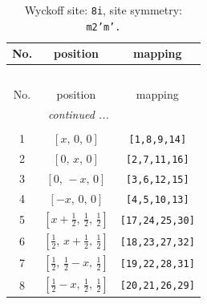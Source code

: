 \documentclass[fleqn,8pt]{jsarticle}
\begin{document}
\begin{longtable}{ccc}
\caption{Wyckoff site: {\tt 8i}, site symmetry: {\tt m2'm'.}}
 \\
 \hline \hline
No. & position & mapping \\ \hline \endfirsthead

\multicolumn{2}{l}{\tablename\ \thetable{}} \\
 \hline \hline
No. & position & mapping \\ \hline \endhead

 \hline \hline
\multicolumn{2}{r}{\footnotesize\it continued ...} \\ \endfoot

 \hline \hline
\multicolumn{2}{r}{} \\ \endlastfoot

1 & $\left[ x,\, 0,\, 0 \right]$ & {\tt [1,8,9,14]} \\ \hline
2 & $\left[ 0,\, x,\, 0 \right]$ & {\tt [2,7,11,16]} \\ \hline
3 & $\left[ 0,\, - x,\, 0 \right]$ & {\tt [3,6,12,15]} \\ \hline
4 & $\left[ - x,\, 0,\, 0 \right]$ & {\tt [4,5,10,13]} \\ \hline
5 & $\left[ x + \frac{1}{2},\, \frac{1}{2},\, \frac{1}{2} \right]$ & {\tt [17,24,25,30]} \\ \hline
6 & $\left[ \frac{1}{2},\, x + \frac{1}{2},\, \frac{1}{2} \right]$ & {\tt [18,23,27,32]} \\ \hline
7 & $\left[ \frac{1}{2},\, \frac{1}{2} - x,\, \frac{1}{2} \right]$ & {\tt [19,22,28,31]} \\ \hline
8 & $\left[ \frac{1}{2} - x,\, \frac{1}{2},\, \frac{1}{2} \right]$ & {\tt [20,21,26,29]} \\
\end{longtable}
\renewcommand{\arraystretch}{1.2}
\end{document}
